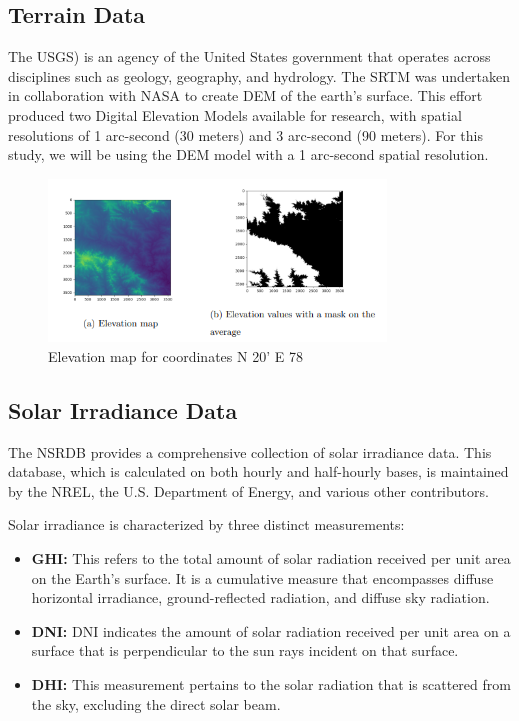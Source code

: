 \documentclass[a4paper,12pt]{Classes/RoboticsLaTeX}
\begin{document}
	

	\subsection{Terrain Data}

	The \ac{USGS}) is an agency of the United States government that operates across disciplines such as geology, geography, and hydrology. 
	The \ac{SRTM} was undertaken in collaboration with \ac{NASA} to create \ac{DEM} 
	of the earth's surface. This effort produced two Digital Elevation Models available for research, with spatial resolutions of 1 arc-second (30 meters) and 3 arc-second 
	(90 meters). For this study, we will be using the DEM model with a 1 arc-second spatial resolution\cite{farr2000}.

	\begin{figure}[H]
		\centering
		\includegraphics[width=0.8\textwidth]{Figures/Terrain.png} %
		\caption{Elevation map for coordinates N 20' E 78}
		\label{fig:my_label2} %
	\end{figure}

	\subsection{ Solar Irradiance Data}

	The \ac{NSRDB} provides a comprehensive collection of solar irradiance data. This database, which is calculated on both hourly and 
	half-hourly bases, is maintained by the \ac{NREL}, the U.S. Department of Energy, and various other contributors\cite{sengupta2018}. 

	Solar irradiance is characterized by three distinct measurements:

	\begin{itemize}
		\item \textbf{\ac{GHI}:} This refers to the total amount of solar radiation received per unit area on the Earth's surface. It is a cumulative measure that encompasses diffuse horizontal irradiance, ground-reflected radiation, and diffuse sky radiation.
		
		\item \textbf{\ac{DNI}:} \ac{DNI} indicates the amount of solar radiation received per unit area on a surface that is perpendicular to the sun rays incident on that surface.
		
		\item \textbf{\ac{DHI}:} This measurement pertains to the solar radiation that is scattered from the sky, excluding the direct solar beam.
	\end{itemize}
\end{document}

